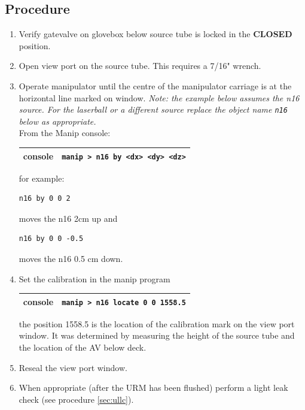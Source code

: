 \documentclass[11pt]{article}
\begin{document}
\subsection{Procedure}
\begin{enumerate}
\item \CheckBox[name=ucl1]{} Verify gatevalve on glovebox below source tube is locked in the {\bf CLOSED} position.
\item \CheckBox[name=ucl2]{} Open view port on the source tube. This requires a 7/16" wrench.
\item \CheckBox[name=ucl3]{} Operate manipulator until the centre of the manipulator carriage is at the horizontal line marked on window. {\it Note: the example below assumes the n16 source. For the laserball or a different source replace the object name \verb+n16+ below as appropriate.}\\
From the Manip console: 
\begin{center}
\begin{tabular}{|c|c|}
\hline
console & \verb+manip > n16 by <dx> <dy> <dz>+\\
\hline
\end{tabular}
\end{center}
for example: 
\begin{center}
\begin{verbatim}
n16 by 0 0 2
\end{verbatim}
\end{center}
moves the n16 2cm up and 
\begin{center}
\begin{verbatim}
n16 by 0 0 -0.5
\end{verbatim}
\end{center}
moves the n16 0.5 cm down.
\item \CheckBox[name=ucl4]{} Set the calibration in the manip program
\begin{center}
\begin{tabular}{|c|c|}
\hline
console & \verb+manip > n16 locate 0 0 1558.5+ \\
\hline
\end{tabular}
\end{center}
the position 1558.5 is the location of the calibration mark on the view port window. It was determined by measuring the height of the source tube and the location of the AV below deck.
\item \CheckBox[name=ucl5]{} Reseal the view port window.
\item \CheckBox[name=ucl6]{} When appropriate (after the URM has been flushed) perform a light leak check (see procedure \ref{sec:ullc}).
\end{enumerate}
\end{document}
